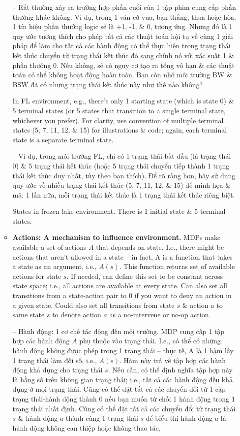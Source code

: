\documentclass{article}
\begin{document}
\begin{itemize}
\begin{itemize}
        -- Rất thường xảy ra trường hợp phần cuối của 1 tập phim cung cấp phần thưởng khác không. Ví dụ, trong 1 ván cờ vua, bạn thắng, thua hoặc hòa. 1 tín hiệu phần thưởng logic sẽ là +1, -1, \& 0, tương ứng. Nhưng đó là 1 quy ước tương thích cho phép tất cả các thuật toán hội tụ về cùng 1 giải pháp để làm cho tất cả các hành động có thể thực hiện trong trạng thái kết thúc chuyển từ trạng thái kết thúc đó sang chính nó với xác suất 1 \& phần thưởng 0. Nếu không, sẽ có nguy cơ tạo ra tổng vô hạn \& các thuật toán có thể không hoạt động hoàn toàn. Bạn còn nhớ môi trường BW \& BSW đã có những trạng thái kết thúc này như thế nào không?

        In FL environment, e.g., there's only 1 starting state (which is state 0) \& 5 terminal states (or 5 states that transition to a single terminal state, whichever you prefer). For clarity, use convention of multiple terminal states (5, 7, 11, 12, \& 15) for illustrations \& code; again, each terminal state is a separate terminal state.

        -- Ví dụ, trong môi trường FL, chỉ có 1 trạng thái bắt đầu (là trạng thái 0) \& 5 trạng thái kết thúc (hoặc 5 trạng thái chuyển tiếp thành 1 trạng thái kết thúc duy nhất, tùy theo bạn thích). Để rõ ràng hơn, hãy sử dụng quy ước về nhiều trạng thái kết thúc (5, 7, 11, 12, \& 15) để minh họa \& mã; 1 lần nữa, mỗi trạng thái kết thúc là 1 trạng thái kết thúc riêng biệt.

        {\sf States in frozen lake environment.} There is 1 initial state \& 5 terminal states.
        \item {\bf Actions: A mechanism to influence environment.} MDPs make available a set of actions $A$ that depends on state. I.e., there might be actions that aren't allowed in a state -- in fact, A is a function that takes a state as an argument, i.e., $A(s)$. This function returns set of available actions for state $s$. If needed, can define this set to be constant across state space; i.e., all actions are available at every state. Can also set all transitions from a state-action pair to 0 if you want to deny an action in a given state. Could also set all transitions from state $s$ \& action $a$ to same state $s$ to denote action $a$ as a no-intervene or no-op action.

        -- {\sf Hành động: 1 cơ chế tác động đến môi trường.} MDP cung cấp 1 tập hợp các hành động $A$ phụ thuộc vào trạng thái. I.e., có thể có những hành động không được phép trong 1 trạng thái -- thực tế, A là 1 hàm lấy 1 trạng thái làm đối số, i.e., $A(s)$. Hàm này trả về tập hợp các hành động khả dụng cho trạng thái $s$. Nếu cần, có thể định nghĩa tập hợp này là hằng số trên không gian trạng thái; i.e., tất cả các hành động đều khả dụng ở mọi trạng thái. Cũng có thể đặt tất cả các chuyển đổi từ 1 cặp trạng thái-hành động thành 0 nếu bạn muốn từ chối 1 hành động trong 1 trạng thái nhất định. Cũng có thể đặt tất cả các chuyển đổi từ trạng thái $s$ \& hành động $a$ thành cùng 1 trạng thái $s$ để biểu thị hành động $a$ là hành động không can thiệp hoặc không thao tác.


\end{itemize}
\end{itemize}
\end{document}
